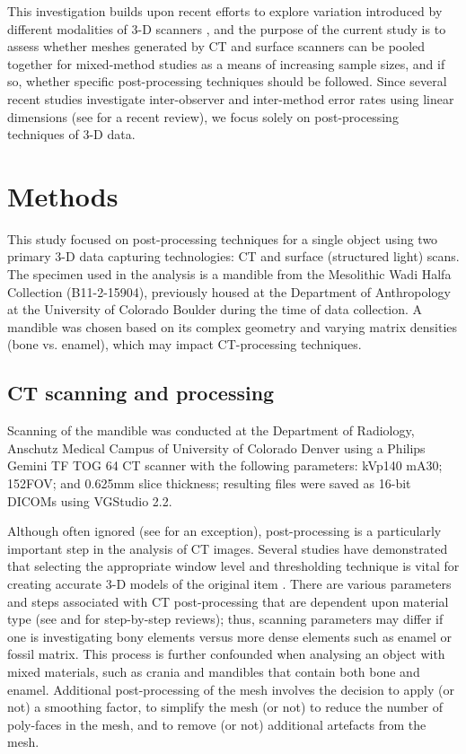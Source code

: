 \documentclass[review]{elsarticle}
\begin{document}
This investigation builds upon recent efforts to explore variation introduced by different modalities of 3-D scanners \citet{RN11522}, and the purpose of the current study is to assess whether meshes generated by CT and surface scanners can be pooled together for mixed-method studies as a means of increasing sample sizes, and if so, whether specific post-processing techniques should be followed. Since several recent studies investigate inter-observer and inter-method error rates using linear dimensions (see \citealt{RN11945} for a recent review), we focus solely on post-processing techniques of 3-D data. 

\section{Methods}

This study focused on post-processing techniques for a single object using two primary 3-D data capturing technologies: CT and surface (structured light) scans. The specimen used in the analysis is a mandible from the Mesolithic Wadi Halfa Collection  (B11-2-15904), previously housed at the Department of Anthropology at the University of Colorado Boulder during the time of data collection. A mandible was chosen based on its complex geometry and varying matrix densities (bone vs. enamel), which may impact CT-processing techniques.

\subsection{CT scanning and processing}

Scanning of the mandible was conducted at the Department of Radiology, Anschutz Medical Campus of University of Colorado Denver using a Philips Gemini TF TOG 64 CT scanner with the following parameters: kVp140 mA30; 152FOV; and 0.625mm slice thickness; resulting files were saved as 16-bit DICOMs using VGStudio 2.2. 

Although often ignored (see \citealt{RN8984} for an exception), post-processing is a particularly important step in the analysis of CT images. Several studies have demonstrated that selecting the appropriate window level and thresholding technique is vital for creating accurate 3-D models of the original item \citep{RN11483,RN11485,RN11486}. There are various parameters and steps associated with CT post-processing that are dependent upon material type (see \citealt{RN11484} and \citealt{RN11478} for step-by-step reviews); thus, scanning parameters may differ if one is investigating bony elements versus more dense elements such as enamel or fossil matrix. This process is further confounded when analysing an object with mixed materials, such as crania and mandibles that contain both bone and enamel. Additional post-processing of the mesh involves the decision to apply (or not) a smoothing factor, to simplify the mesh (or not) to reduce the number of poly-faces in the mesh, and to remove (or not) additional artefacts from the mesh. 
\end{document}
